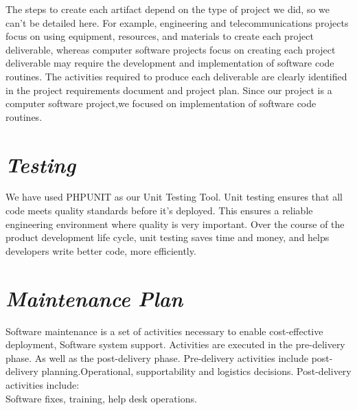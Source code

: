 \documentclass[14pt,a4paper,calibribody]{article}
\begin{document}
The steps to create each artifact depend on the type of project we did, so we can't be detailed here. For example, engineering and telecommunications projects focus on using equipment, resources, and materials to create each project deliverable, whereas computer software projects focus on creating each project deliverable may require the development and implementation of software code routines. The activities required to produce each deliverable are clearly identified in the project requirements document and project plan. Since our project is a computer software project,we focused on implementation of software code routines.\\
\clearpage
\section{\emph{\large{Testing }}}
We have used PHPUNIT as our Unit Testing Tool. Unit testing ensures that all code meets quality standards before it's deployed. This ensures a reliable engineering environment where quality is
very important. Over the course of the product development life cycle, unit testing saves time and money, and helps developers write better code, more efficiently.\\
\section{\emph{\large{Maintenance Plan }}}
Software maintenance is a set of activities necessary to enable cost-effective deployment, Software system support. Activities are executed in the pre-delivery phase. As well as the post-delivery phase. Pre-delivery activities include post-delivery planning.Operational, supportability and logistics decisions. Post-delivery activities include:\\
Software fixes, training, help desk operations.\\
\end{document}
